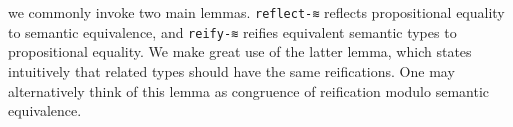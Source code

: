 \documentclass[authoryear, acmsmall, screen, review, nonacm]{acmart}
\begin{document}
\begin{code}[hide]
\AgdaSymbol{=}\AgdaSpace{}%
\AgdaOperator{\AgdaInductiveConstructor{R[}}\AgdaSpace{}%
\AgdaSpace{}%
\AgdaOperator{\AgdaInductiveConstructor{]}}\AgdaSymbol{\}}\AgdaSpace{}%
\AgdaSymbol{\{}\AgdaSpace{}%
\AgdaSymbol{(}\AgdaSpace{}%
\AgdaSymbol{(}\AgdaSpace{}%
\AgdaOperator{\AgdaInductiveConstructor{,}}\AgdaSpace{}%
\AgdaSymbol{))\}}\AgdaSpace{}%
\AgdaSymbol{\{}\AgdaSpace{}%
\AgdaSymbol{(}\AgdaSpace{}%
\AgdaSymbol{(}\AgdaSpace{}%
\AgdaOperator{\AgdaInductiveConstructor{,}}\AgdaSpace{}%
\AgdaSymbol{))\}}\AgdaSpace{}%
\AgdaSymbol{\{}\AgdaSpace{}%
\AgdaSymbol{(}\AgdaSpace{}%
\AgdaSymbol{(}\AgdaSpace{}%
\AgdaOperator{\AgdaInductiveConstructor{,}}\AgdaSpace{}%
\AgdaSymbol{))\}}\AgdaSpace{}%
\AgdaSymbol{(}\AgdaSpace{}%
\AgdaOperator{\AgdaInductiveConstructor{,}}\AgdaSpace{}%
\AgdaSymbol{)}\AgdaSpace{}%
\AgdaSymbol{(}\AgdaSpace{}%
\AgdaOperator{\AgdaInductiveConstructor{,}}\AgdaSpace{}%
\AgdaSymbol{)}\AgdaSpace{}%
\AgdaSymbol{=}\AgdaSpace{}%
\AgdaSpace{}%
\AgdaOperator{\AgdaInductiveConstructor{,}}\AgdaSpace{}%
\AgdaSymbol{(}\AgdaSpace{}%
\AgdaSpace{}%
\AgdaSymbol{)}\<%
\end{code}

we commonly invoke two main lemmas. \verb!reflect-≋! reflects propositional equality to semantic equivalence, and \verb!reify-≋! reifies equivalent semantic types to propositional equality. We make great use of the latter lemma, which states intuitively that related types should have the same reifications. One may alternatively think of this lemma as congruence of reification modulo semantic equivalence. 
\end{document}
